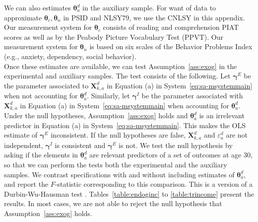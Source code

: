 \noindent We can also estimates $\bm{\theta}_{a}^d$ in the auxiliary sample. For want of data to approximate $\bm{\theta}_{c}, \bm{\theta}_{n}$ in PSID and NLSY79, we use the CNLSY in this appendix. Our measurement system for $\bm{\theta}_{c}$ consists of reading and comprehension PIAT scores as well as by the Peabody Picture Vocabulary Test (PPVT). Our measurement system for $\bm{\theta}_{n}$ is based on six scales of the Behavior Problems Index (e.g., anxiety, dependency, social behavior).\\

\noindent Once these estimates are available, we can test Assumption~\ref{ass:exog} in the experimental and auxiliary samples. The test consists of the following. Let $\bm{\gamma}^E$ be the parameter associated to $\bm{X}^d_{k,a}$ in Equation (a) in System~\eqref{eq:sa-msystemmain} when not accounting for $\bm{\theta}_{a}^d$. Similarly, let $\bm{\gamma}^I$ be the parameter associated with $\bm{X}^d_{k,a}$ in Equation (a) in System~\eqref{eq:sa-msystemmain} when accounting for $\bm{\theta}_{a}^d$. Under the null hypotheses, Assumption~\ref{ass:exog} holds and $\bm{\theta}_{a}^d$ is an irrelevant predictor in Equation (a) in System~\eqref{eq:sa-msystemmain}. This makes the OLS estimate of $\bm{\gamma}^E$ inconsistent. If the null hypotheses are false, $\bm{X}^d_{k,a}$ and $\varepsilon_{a}^d$ are not independent, $\bm{\gamma}^I$ is consistent and $\bm{\gamma}^E$ is not. We test the null hypothesis by asking if the elements in $\bm{\theta}_{a}^d$ are relevant predictors of a set of outcomes at age 30, so that we can perform the tests both the experimental and the auxiliary samples. We contrast specifications with and without including estimates of $\bm{\theta}_{a}^d$, and report the $F$-statistic corresponding to this comparison. This is a version of a Durbin-Wu-Hausman test \citep[see][]{Durbin_1954_RISI,Wu_1973_Econometrica,Hausman_1978_Econometrica}. Tables~\ref{table:endoginc} to \ref{table:trincome} present the results. In most cases, we are not able to reject the null hypothesis that Assumption~\ref{ass:exog} holds.\\


